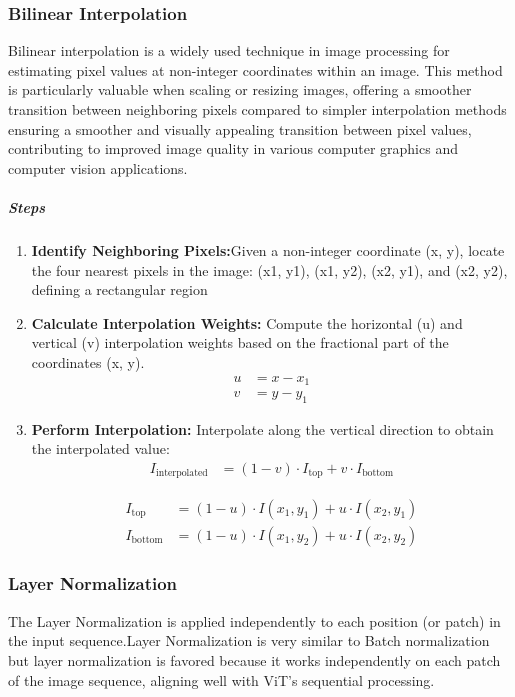\subsubsection{Bilinear Interpolation }
Bilinear interpolation is a widely used technique in image processing for estimating pixel values at non-integer coordinates within an image. This method is particularly valuable when scaling or resizing images, offering a smoother transition between neighboring pixels compared to simpler interpolation methods ensuring a smoother and visually appealing transition between pixel values, contributing to improved image quality in various computer graphics and computer vision applications.
\noindent \subparagraph{Steps}
\begin{enumerate}
    \item \textbf{Identify Neighboring Pixels:}Given a non-integer coordinate (x, y), locate the four nearest pixels in the image: (x1, y1), (x1, y2), (x2, y1), and (x2, y2), defining a rectangular region

    \item \textbf{Calculate Interpolation Weights:} Compute the horizontal (u) and vertical (v) interpolation weights based on the fractional part of the coordinates (x, y).
          \begin{align}
              u & = x - x_1 \label{eq:u_equation} \\
              v & = y - y_1 \label{eq:v_equation}
          \end{align}


    \item \textbf{Perform Interpolation:} Interpolate along the vertical direction to obtain the interpolated value:
          \begin{align}
              I_{\text{interpolated}} & = (1 - v) \cdot I_{\text{top}} + v \cdot I_{\text{bottom}} \label{eq:interpolated_equation}
          \end{align}


          \begin{align}
              I_{\text{top}}    & = (1 - u) \cdot I(x_1, y_1) + u \cdot I(x_2, y_1) \label{eq:itop_equation}    \\
              I_{\text{bottom}} & = (1 - u) \cdot I(x_1, y_2) + u \cdot I(x_2, y_2) \label{eq:ibottom_equation}
          \end{align}


\end{enumerate}
\subsubsection{Layer Normalization}
The Layer Normalization is applied independently to each position (or patch) in the input sequence.Layer Normalization is very similar to Batch normalization but layer normalization is favored because it works independently on each patch of the image sequence, aligning well with ViT's sequential processing.

